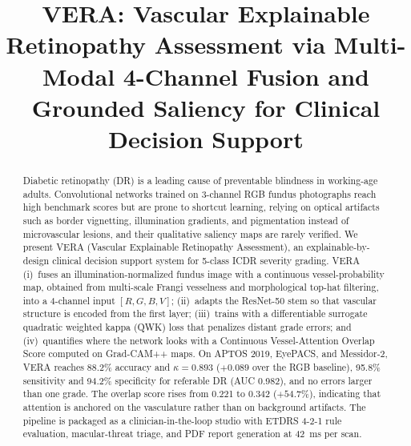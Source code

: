 \documentclass[conference]{IEEEtran}
\begin{document}
\title{VERA: Vascular Explainable Retinopathy Assessment via Multi-Modal 4-Channel Fusion and Grounded Saliency for Clinical Decision Support}

\author{
\and
{}
\and
{}
}

\maketitle

\begin{abstract}
Diabetic retinopathy (DR) is a leading cause of preventable blindness in working-age adults. Convolutional networks trained on 3-channel RGB fundus photographs reach high benchmark scores but are prone to shortcut learning, relying on optical artifacts such as border vignetting, illumination gradients, and pigmentation instead of microvascular lesions, and their qualitative saliency maps are rarely verified. We present VERA (Vascular Explainable Retinopathy Assessment), an explainable-by-design clinical decision support system for 5-class ICDR severity grading. VERA (i)~fuses an illumination-normalized fundus image with a continuous vessel-probability map, obtained from multi-scale Frangi vesselness and morphological top-hat filtering, into a 4-channel input $[R,G,B,V]$; (ii)~adapts the ResNet-50 stem so that vascular structure is encoded from the first layer; (iii)~trains with a differentiable surrogate quadratic weighted kappa (QWK) loss that penalizes distant grade errors; and (iv)~quantifies where the network looks with a Continuous Vessel-Attention Overlap Score computed on Grad-CAM++ maps. On APTOS 2019, EyePACS, and Messidor-2, VERA reaches 88.2\% accuracy and $\kappa=0.893$ ($+0.089$ over the RGB baseline), 95.8\% sensitivity and 94.2\% specificity for referable DR (AUC 0.982), and no errors larger than one grade. The overlap score rises from 0.221 to 0.342 ($+54.7\%$), indicating that attention is anchored on the vasculature rather than on background artifacts. The pipeline is packaged as a clinician-in-the-loop studio with ETDRS 4-2-1 rule evaluation, macular-threat triage, and PDF report generation at 42~ms per scan.
\end{abstract}
\end{document}
